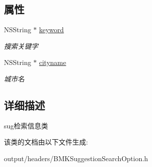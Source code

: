 \subsection*{属性}
\begin{DoxyCompactItemize}
\item 
\hypertarget{interface_b_m_k_suggestion_search_option_a2b769ad03eb52e46d9e14e8c096b6b43}{}N\+S\+String $\ast$ \hyperlink{interface_b_m_k_suggestion_search_option_a2b769ad03eb52e46d9e14e8c096b6b43}{keyword}\label{interface_b_m_k_suggestion_search_option_a2b769ad03eb52e46d9e14e8c096b6b43}

\begin{DoxyCompactList}\small\item\em 搜索关键字 \end{DoxyCompactList}\item 
\hypertarget{interface_b_m_k_suggestion_search_option_a938c2265022ca94d18c636388fc75e68}{}N\+S\+String $\ast$ \hyperlink{interface_b_m_k_suggestion_search_option_a938c2265022ca94d18c636388fc75e68}{cityname}\label{interface_b_m_k_suggestion_search_option_a938c2265022ca94d18c636388fc75e68}

\begin{DoxyCompactList}\small\item\em 城市名 \end{DoxyCompactList}\end{DoxyCompactItemize}


\subsection{详细描述}
sug检索信息类 

该类的文档由以下文件生成\+:\begin{DoxyCompactItemize}
\item 
output/headers/B\+M\+K\+Suggestion\+Search\+Option.\+h\end{DoxyCompactItemize}
